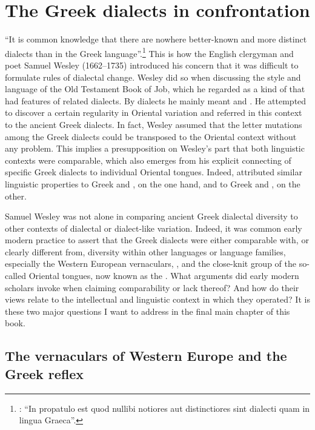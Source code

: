 \chapter{The Greek dialects in confrontation}\label{chap:8}

“It is common knowledge that there are nowhere better-known and more distinct dialects than in the Greek language”.\footnote{\citet[23]{Wesley1736}: “In propatulo est quod nullibi notiores aut distinctiores sint dialecti quam in lingua Graeca”.} This is how the English clergyman and poet Samuel Wesley (1662–1735) introduced his concern that it was difficult to formulate rules of dialectal change. Wesley did so when discussing the style and language of the Old Testament Book of Job, which he regarded as a kind of  that had features of related dialects. By dialects he mainly meant  and . He attempted to discover a certain regularity in Oriental variation and referred in this context to the ancient Greek dialects. In fact, Wesley assumed that the letter mutations among the Greek dialects could be transposed to the Oriental context without any problem. This implies a presupposition on Wesley’s part that both linguistic contexts were comparable, which also emerges from his explicit connecting of specific Greek dialects to individual Oriental tongues. Indeed, \citet[24]{Wesley1736} attributed similar linguistic properties to  Greek and , on the one hand, and to  Greek and , on the other.

Samuel Wesley was not alone in comparing ancient Greek dialectal diversity to other contexts of dialectal or dialect-like variation. Indeed, it was common early modern practice to assert that the Greek dialects were either comparable with, or clearly different from, diversity within other languages or language families, especially the Western European vernaculars, , and the close-knit group of the so-called Oriental tongues, now known as the  . What arguments did early modern scholars invoke when claiming comparability or lack thereof? And how do their views relate to the intellectual and linguistic context in which they operated? It is these two major questions I want to address in the final main chapter of this book.

\section{The vernaculars of Western Europe and the Greek reflex}\label{sec:8.1}

